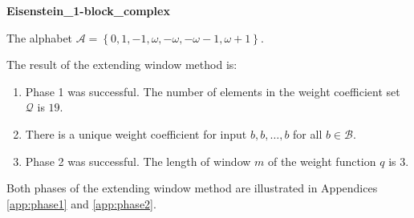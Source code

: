 \begin{exmp}
\textbf{ Eisenstein\_1-block\_complex }

\label{ex:Eisenstein1-blockcomplex}

The alphabet $\mathcal{A} =\left\{0, 1, -1, \omega, -\omega, -\omega - 1, \omega + 1\right\}$.

The result of the extending window method is:
\begin{enumerate}
    \item Phase 1 was successful.
The number of elements in the weight coefficient set $\mathcal{Q}$ is $19$.

    \item There is a unique weight coefficient for input $b,b,\dots,b$ for all $b\in\mathcal{B}$.

    \item Phase 2 was successful.
The length of window $m$ of the weight function $q$ is 3.
\end{enumerate}
Both phases of the extending window method are illustrated in Appendices \ref{app:phase1} and \ref{app:phase2}.
\end{exmp}
